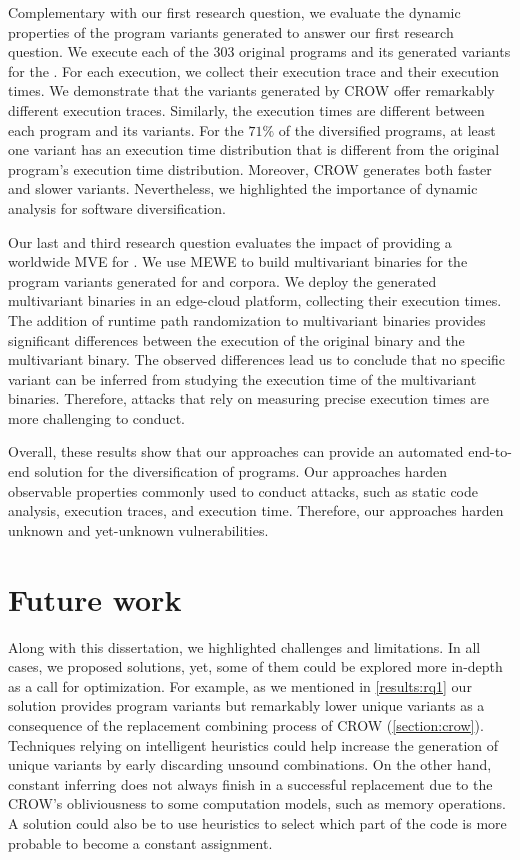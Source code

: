 Complementary with our first research question, we evaluate the dynamic properties of the program variants generated to answer our first research question.
We execute each of the 303 original programs and its generated variants for the \corpusrosetta.
For each execution, we collect their execution trace and their execution times.
We demonstrate that the \wasm variants generated by CROW offer remarkably different execution traces.
Similarly, the execution times are different between each program and its variants.
For the $71\%$ of the diversified programs, at least one variant has an execution time distribution that is different from the original program's execution time distribution.
Moreover, CROW generates both faster and slower variants.
Nevertheless, we highlighted the importance of dynamic analysis for software diversification. 

Our last and third research question evaluates the impact of providing a worldwide MVE for \wasm.
We use MEWE to build multivariant binaries for the program variants generated for \corpussodium and \corpusqrcode corpora.
We deploy the generated multivariant binaries in an edge-cloud platform, collecting their execution times.
The addition of runtime path randomization to multivariant binaries provides significant differences between the execution of the original binary and the multivariant binary.
The observed differences lead us to conclude that no specific variant can be inferred from studying the execution time of the multivariant binaries. Therefore, attacks that rely on measuring precise execution times are more challenging to conduct.


Overall, these results show that our approaches can provide an automated end-to-end solution for the diversification of \wasm programs. 
Our approaches harden observable properties commonly used to conduct attacks, such as static code analysis, execution traces, and execution time.
Therefore, our approaches harden unknown and yet-unknown vulnerabilities.


\section{Future work}
\label{future_work}

Along with this dissertation, we highlighted challenges and limitations. In all cases, we proposed solutions, yet, some of them could be explored more in-depth as a call for optimization. For example,
as we mentioned in \autoref{results:rq1} our solution provides program variants but remarkably lower unique variants as a consequence of the replacement combining process of CROW (\autoref{section:crow}). 
Techniques relying on intelligent heuristics could help increase the generation of unique variants by early discarding unsound combinations.
On the other hand, constant inferring does not always finish in a successful replacement due to the CROW's obliviousness to some computation models, such as memory operations. 
A solution could also be to use heuristics to select which part of the code is more probable to become a constant assignment.

